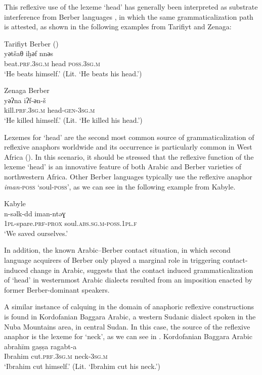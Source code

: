 \documentclass[output=paper]{langsci/langscibook}
\begin{document}
This reflexive use of the lexeme ‘head’ has generally been interpreted as substrate interference from Berber languages \citep[197]{ElAissati2011}, in which the same grammaticalization path is attested, as shown in the following examples from Tarifiyt and Zenaga: 

\ea
{Tarifiyt Berber (\citealt[95]{Kossmann2000})}\\
\gll   yәtšaθ iḫәf nnәs\\
       beat.\textsc{prf.3sg.m} head \textsc{poss.3sg.m}\\
\glt   `He beats himself.' (Lit. ‘He beats his head.’)
\z

\ea
{Zenaga Berber \citep[126]{Taine-Cheikh2008chapter}}\\
\gll   yәʔna iʔf-әn-š\\
       kill.\textsc{prf.3sg.m} head-\textsc{gen-3sg.m}\\
\glt   `He killed himself.' (Lit. ‘He killed his head.’)
\z

Lexemes for ‘head’ are the second most common source of grammaticalization of reflexive anaphors worldwide \citep{KönigTöpper2013} and its occurrence is particularly common in West Africa (\citealt[50]{Heine2011}). In this scenario, it should be stressed that the reflexive function of the lexeme ‘head’ is an innovative feature of both Arabic and Berber varieties of northwestern Africa. Other Berber languages typically use the reflexive anaphor \textit{iman-}\textsc{poss} ‘soul-\textsc{poss}’, as we can see in the following example from Kabyle.

\ea
{Kabyle \citep{Mettouchi2012}}\\
\gll   n-səlk-dd       iman-ntəɣ\\
       \textsc{1pl}-spare.\textsc{prf-prox} soul.\textsc{abs.sg.m-poss.1pl.f}\\
\glt   `We saved ourselves.'\\
\z

In addition, the known Arabic–Berber contact situation, in which second language acquirers of Berber only played a marginal role in triggering contact-induced change in Arabic, suggests that the contact induced grammaticalization of ‘head’ in westernmost Arabic dialects resulted from an imposition enacted by former Berber-dominant speakers.  

A similar instance of calquing in the domain of anaphoric reflexive constructions is found in Kordofanian Baggara Arabic, a western Sudanic dialect spoken in the Nuba Mountains area, in central Sudan. In this case, the source of the reflexive anaphor is the lexeme for ‘neck’, as we can see in .  
\newpage
\ea\label{20}
{Kordofanian Baggara Arabic \citep[176]{Manfredi2010}}\\
\gll  abrahīm gaṣṣa ragabt-a\\
       Ibrahim cut.\textsc{prf.3sg.m} neck-\textsc{3sg.m}\\
\glt   `Ibrahim cut himself.' (Lit. `Ibrahim cut his neck.')
\z
\end{document}
